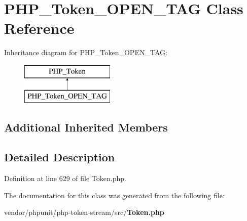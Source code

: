 \section{P\+H\+P\+\_\+\+Token\+\_\+\+O\+P\+E\+N\+\_\+\+T\+A\+G Class Reference}
\label{class_p_h_p___token___o_p_e_n___t_a_g}
Inheritance diagram for P\+H\+P\+\_\+\+Token\+\_\+\+O\+P\+E\+N\+\_\+\+T\+A\+G\+:\begin{figure}[H]
\begin{center}
\leavevmode
\includegraphics[height=2.000000cm]{class_p_h_p___token___o_p_e_n___t_a_g}
\end{center}
\end{figure}
\subsection*{Additional Inherited Members}


\subsection{Detailed Description}


Definition at line 629 of file Token.\+php.



The documentation for this class was generated from the following file\+:\begin{DoxyCompactItemize}
\item 
vendor/phpunit/php-\/token-\/stream/src/{\bf Token.\+php}\end{DoxyCompactItemize}
